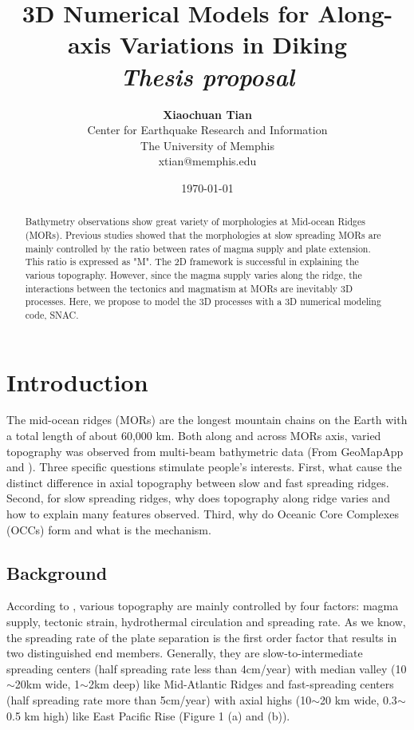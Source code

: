 \documentclass[12pt]{article}
\title{{\bf 3D Numerical Models for Along-axis Variations in Diking} \\
\it Thesis proposal}
\author{ {\bf Xiaochuan Tian}  \\
Center for Earthquake Research and Information \\
The University of Memphis\\
{\small xtian@memphis.edu}
}
\date{\today}
\begin{document}
\pagestyle{plain}
\maketitle

\pagebreak
\begin{abstract}

Bathymetry observations show great variety of morphologies at Mid-ocean Ridges (MORs). Previous studies showed that the morphologies at slow spreading MORs are mainly controlled by the ratio between rates of magma supply and plate extension. This ratio is expressed as "M". The 2D framework is successful in explaining the various topography. However, since the magma supply varies along the ridge, the interactions between the tectonics and magmatism at MORs are inevitably 3D processes. Here, we propose to model the 3D processes with a 3D numerical modeling code, SNAC.

\end{abstract}

\pagebreak
\tableofcontents
\pagebreak

\cleardoublepage
{}

\section{Introduction}
\label{ch:intro}
The mid-ocean ridges (MORs) are the longest mountain chains on the Earth with a total length of about 60,000 km. Both along and across MORs axis, varied topography was observed from multi-beam bathymetric data (From GeoMapApp and \citep{Ryan2009}). Three specific questions stimulate people's interests. First, what cause the distinct difference in axial topography between slow and fast spreading ridges. Second, for slow spreading ridges, why does topography  along ridge varies and how to explain many features observed. Third, why do Oceanic Core Complexes (OCCs) form and what is the mechanism. 

\subsection{Background}
\label{ch:back}
According to \citep{Fowler2004}, various topography are mainly
controlled by four factors: magma supply, tectonic strain, hydrothermal circulation and spreading rate. As we know, the spreading rate of the plate separation is the first order factor that results in two distinguished end members. Generally, they are slow-to-intermediate spreading centers (half spreading rate less than 4cm/year) with median valley (10$\sim$20km wide, 1$\sim$2km deep) like Mid-Atlantic Ridges and fast-spreading centers (half spreading rate more than 5cm/year) with axial highs (10$\sim$20 km wide, 0.3$\sim$0.5 km high) like East Pacific Rise (Figure 1 (a) and (b)).
\end{document}
